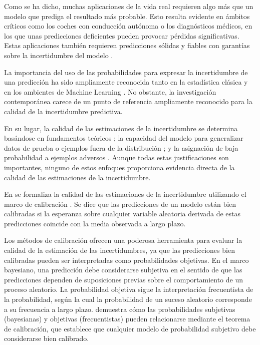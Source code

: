 \documentclass[10pt, oneside, a4paper]{article}
\begin{document}
	Como se ha dicho, muchas aplicaciones de la vida real requieren algo más que un modelo que prediga el resultado más probable. Esto resulta evidente en ámbitos críticos como los coches con conducción autónoma o los diagnósticos médicos, en los que unas predicciones deficientes pueden provocar pérdidas significativas. Estas aplicaciones también requieren predicciones sólidas y fiables con garantías sobre la incertidumbre del modelo \cite{kendall2017uncertainties}.
	
	La importancia del uso de las probabilidades para expresar la incertidumbre de una predicción ha sido ampliamente reconocida tanto en la estadística clásica \cite{dawid1982well,murphy1977reliability} y en los ambientes de Machine Learning \cite{Gal2016UncertaintyID, guo2017calibration, hernandez2015probabilistic,li2017dropout}. No obstante, la investigación contemporánea carece de un punto de referencia ampliamente reconocido para la calidad de la incertidumbre predictiva. 
	
	En su lugar, la calidad de las estimaciones de la incertidumbre se determina basándose en fundamentos teóricos \cite{pmlr-v48-hernandez-lobatob16,keskar2016large,li2017approximate}; la capacidad del modelo para generalizar datos de prueba o ejemplos fuera de la distribución \cite{blundell2015weight,gal2016dropout,graves2011practical,korattikara2015bayesian}; y la asignación de baja probabilidad a ejemplos adversos \cite{li2017dropout}. Aunque todas estas justificaciones son importantes, ninguno de estos enfoques proporciona evidencia directa de la calidad de las estimaciones de la incertidumbre.
	
	En \cite{heek2018well} se formaliza la calidad de las estimaciones de la incertidumbre utilizando el marco de calibración \cite{dawid1982well}. Se dice que las predicciones de un modelo están bien calibradas si la esperanza sobre cualquier variable aleatoria derivada de estas predicciones coincide con la media observada a largo plazo. %
	
	Los métodos de calibración ofrecen una poderosa herramienta para evaluar la calidad de la estimación de las incertidumbres, ya que las predicciones bien calibradas pueden ser interpretadas como probabilidades objetivas. En el marco bayesiano, una predicción debe considerarse subjetiva en el sentido de que las predicciones
	dependen de suposiciones previas sobre el comportamiento de un proceso aleatorio. La probabilidad objetiva sigue la interpretación frecuentista de la probabilidad, según la cual la probabilidad de un suceso aleatorio corresponde a su frecuencia a largo plazo. \cite{heek2018well} demuestra cómo las probabilidades subjetivas (bayesianas) y objetivas (frecuentistas) pueden relacionarse mediante el teorema de calibración, que establece que cualquier modelo de probabilidad subjetivo debe considerarse bien calibrado.
	
\end{document}
